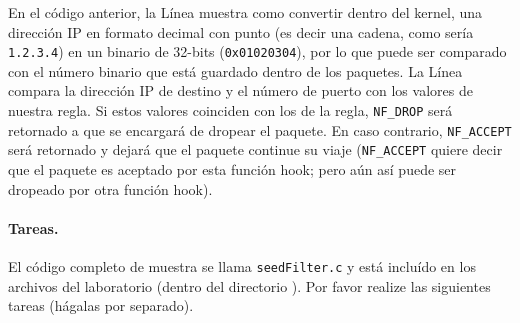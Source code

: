 En el código anterior, la Línea  muestra como convertir dentro del kernel, una dirección IP en formato decimal con punto (es decir una cadena, como sería \texttt{1.2.3.4}) en un binario de 32-bits (\texttt{0x01020304}), por lo que puede ser comparado con el número binario que está guardado dentro de los paquetes.
La Línea  compara la dirección IP de destino y el número de puerto con los valores de nuestra regla. Si estos valores coinciden con los de la regla,  \texttt{NF\_DROP} será retornado a \netfilter que se encargará de dropear el paquete. En caso contrario, \texttt{NF\_ACCEPT} será retornado y \netfilter dejará que el paquete continue su viaje (\texttt{NF\_ACCEPT} quiere decir que el paquete es aceptado por esta función hook; pero aún así puede ser dropeado por otra función hook).

\paragraph{Tareas.} El código completo de muestra se llama \texttt{seedFilter.c} y está incluído en los archivos del laboratorio (dentro del directorio ). Por favor realize las siguientes tareas (hágalas por separado).

